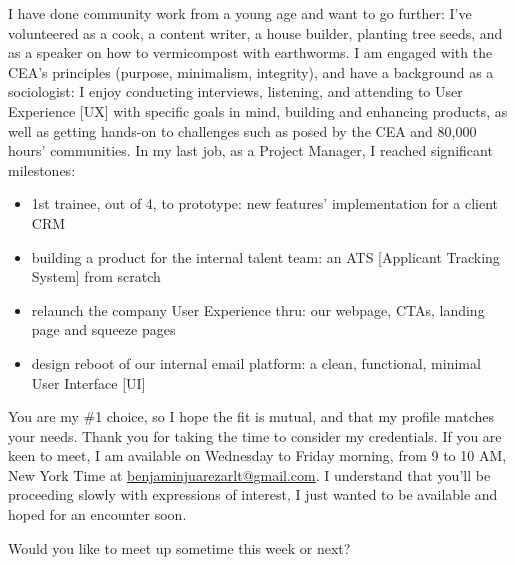 I have done community work from a young age and want to go further: 
I've volunteered as 
a cook, a content writer, a house builder, planting tree seeds, 
and as a speaker on how to vermicompost with earthworms.
%
I am engaged with the CEA's %
principles %
(purpose, minimalism, integrity), %
and have a background as a sociologist: I enjoy conducting interviews, listening, 
and attending to User Experience [UX] 
with specific goals in mind, building and enhancing products, as well as getting hands-on
to challenges such as posed by the CEA and 80,000 hours' communities. 
% 
In my last job, as a Project Manager, I 
reached significant milestones: 
\begin{itemize}
 \item 1st trainee, out of 4, to prototype: new features' implementation for a client CRM 
 \item building a
 product for the internal talent team: 
 an ATS [Applicant Tracking System] 
 from scratch 
 \item relaunch the company User Experience thru: our webpage, CTAs, landing page and squeeze pages
 \item 
 design 
 reboot of
 our internal email platform:
 a clean, functional, minimal User Interface [UI] 
\end{itemize}

You are my \#1 choice, so
I hope the fit is mutual, 
and that my profile matches your needs.
Thank you for taking the time to consider my credentials.
If you are keen to meet, I am available on Wednesday to Friday morning, from 9 to 10 AM, New York Time 
at
\href{benjaminjuarezarlt@gmail.com}{benjaminjuarezarlt@gmail.com}. I understand that you'll be proceeding slowly with expressions of interest, I just wanted to be available and hoped for an encounter soon.

Would you like to meet up sometime this week or next? 

\bigskip %

